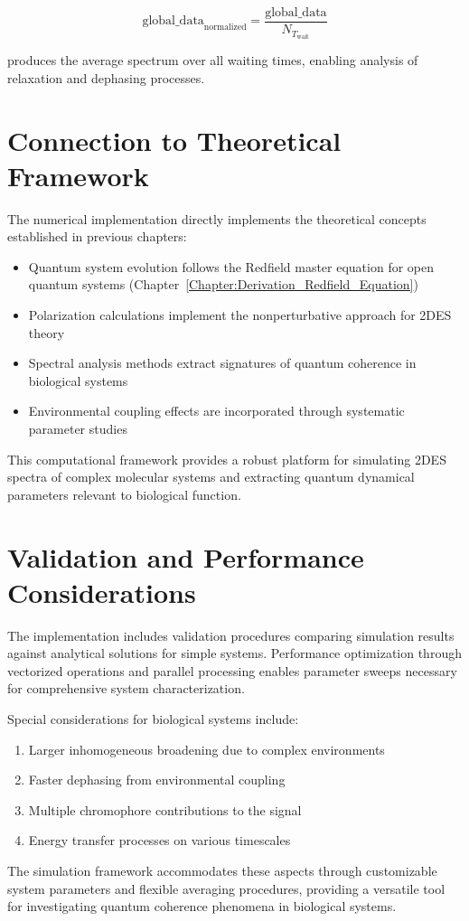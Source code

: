 \begin{equation}
	\label{eq:global_normalization}
	\text{global\_data}_{\text{normalized}} = \frac{\text{global\_data}}{N_{T_{\text{wait}}}}
\end{equation}

\noindent
produces the average spectrum over all waiting times, enabling analysis of relaxation and dephasing processes.

\section{Connection to Theoretical Framework}
\label{sec:connection_to_theory}

\noindent
The numerical implementation directly implements the theoretical concepts established in previous chapters:

\begin{itemize}
	\item Quantum system evolution follows the Redfield master equation for open quantum systems (Chapter~\ref{Chapter:Derivation_Redfield_Equation})
	\item Polarization calculations implement the nonperturbative approach for 2DES theory
	\item Spectral analysis methods extract signatures of quantum coherence in biological systems
	\item Environmental coupling effects are incorporated through systematic parameter studies
\end{itemize}

\noindent
This computational framework provides a robust platform for simulating 2DES spectra of complex molecular systems and extracting quantum dynamical parameters relevant to biological function.

\section{Validation and Performance Considerations}
\label{sec:validation_performance}

\noindent
The implementation includes validation procedures comparing simulation results against analytical solutions for simple systems. Performance optimization through vectorized operations and parallel processing enables parameter sweeps necessary for comprehensive system characterization.

\noindent
Special considerations for biological systems include:

\begin{enumerate}
	\item Larger inhomogeneous broadening due to complex environments
	\item Faster dephasing from environmental coupling
	\item Multiple chromophore contributions to the signal
	\item Energy transfer processes on various timescales
\end{enumerate}

\noindent
The simulation framework accommodates these aspects through customizable system parameters and flexible averaging procedures, providing a versatile tool for investigating quantum coherence phenomena in biological systems.